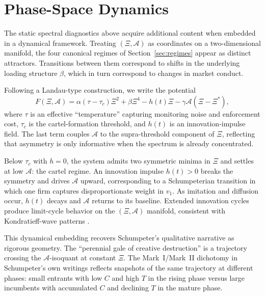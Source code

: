 \documentclass[12pt,a4paper]{article}
\newcommand{\SEA}{\mathcal{A}}
\begin{document}
\section{Phase-Space Dynamics}
\label{sec:dynamics}

The static spectral diagnostics above acquire additional content when embedded in a dynamical framework. Treating $(\Xi, \SEA)$ as coordinates on a two-dimensional manifold, the four canonical regimes of Section~\ref{sec:regimes} appear as distinct attractors. Transitions between them correspond to shifts in the underlying loading structure $\beta$, which in turn correspond to changes in market conduct.

Following a Landau-type construction, we write the potential
\begin{equation}
  F(\Xi, \SEA) = \alpha(\tau - \tau_c) \Xi^2 + \beta \Xi^4 - h(t) \Xi - \gamma \SEA(\Xi - \Xi^*),
  \label{eq:landau}
\end{equation}
where $\tau$ is an effective ``temperature'' capturing monitoring noise and enforcement cost, $\tau_c$ is the cartel-formation threshold, and $h(t)$ is an innovation-impulse field. The last term couples $\SEA$ to the supra-threshold component of $\Xi$, reflecting that asymmetry is only informative when the spectrum is already concentrated.

Below $\tau_c$ with $h = 0$, the system admits two symmetric minima in $\Xi$ and settles at low $\SEA$: the cartel regime. An innovation impulse $h(t) > 0$ breaks the symmetry and drives $\SEA$ upward, corresponding to a Schumpeterian transition in which one firm captures disproportionate weight in $v_1$. As imitation and diffusion occur, $h(t)$ decays and $\SEA$ returns to its baseline. Extended innovation cycles produce limit-cycle behavior on the $(\Xi, \SEA)$ manifold, consistent with Kondratieff-wave patterns \cite{schumpeter1939}.

This dynamical embedding recovers Schumpeter's qualitative narrative as rigorous geometry. The ``perennial gale of creative destruction'' is a trajectory crossing the $\SEA$-isoquant at constant $\Xi$. The Mark~I/Mark~II dichotomy in Schumpeter's own writings reflects snapshots of the same trajectory at different phases: small entrants with low $C$ and high $T$ in the rising phase versus large incumbents with accumulated $C$ and declining $T$ in the mature phase.

\end{document}
